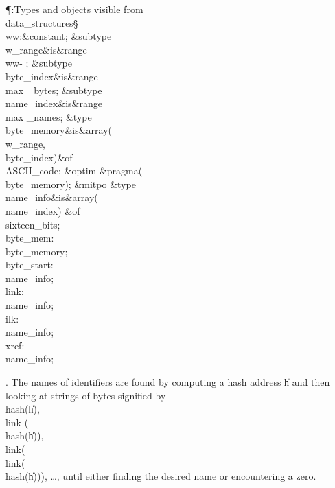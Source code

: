 \Y\P\?\4:Types and objects visible from \\{data\_structures}\X\mathrel{+}\S%
\?\6
\\{ww}\?:\?\&{constant}\8\?\K{};\6
\&{subtype}\8\\{w\_range}\8\&{is}\8\8\&{range}\?\to\?\\{ww}\?-%
;\6
\&{subtype}\8\\{byte\_index}\8\&{is}\8\8\&{range}\?\to\?\\{max%
\_bytes};\6
\&{subtype}\8\\{name\_index}\8\&{is}\8\8\&{range}\?\to\?\\{max%
\_names};\7
\&{type}\8\\{byte\_memory}\8\&{is}\?\8\1\&{array}\8\1(\?\\{w\_range}\?,\?%
\\{byte\_index}\?\2)\2\8\&{of}\?\8\\{ASCII\_code};\6
\&{optim}\1\6
\&{pragma}\8\1\?\1(\?\\{byte\_memory}\?\2)\?\2;\2\6
\&{mitpo}\7
\&{type}\8\\{name\_info}\8\&{is}\?\8\1\&{array}\8\1(\?\\{name\_index}\?\2)\2\8%
\&{of}\?\8\\{sixteen\_bits};\7
\\{byte\_mem}\?:\?\\{byte\_memory};\6
\\{byte\_start}\?:\?\\{name\_info};\6
\\{link}\?:\?\\{name\_info};\6
\\{ilk}\?:\?\\{name\_info};\6
\\{xref}\?:\?\\{name\_info};\par
\fi

. The names of identifiers are found by computing a hash address \|h and
then looking at strings of bytes signified by \\{hash}\?(\?\|h\?)\?, \\{link}%
\?(\?\\{hash}\?(\?\|h\?))\?,
\\{link}\?(\?\\{link}\?(\?\\{hash}\?(\?\|h\?)))\?, \dots, until either finding
the desired name
or encountering a zero.

